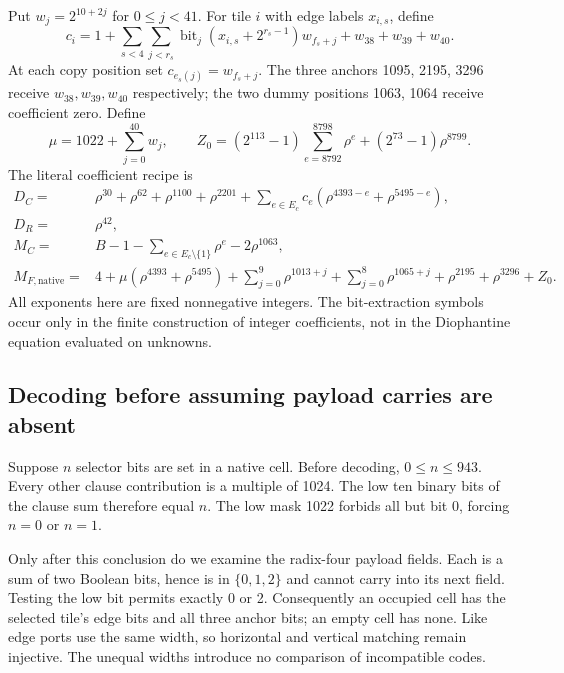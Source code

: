 \documentclass[11pt]{article}
\begin{document}
Put $w_j=2^{10+2j}$ for $0\le j<41$. For tile $i$ with edge labels
$x_{i,s}$, define
\[
 c_i=1+\sum_{s<4}\sum_{j<r_s}
   \operatorname{bit}_j(x_{i,s}+2^{r_s-1})w_{f_s+j}
   +w_{38}+w_{39}+w_{40}.
\]
At each copy position set $c_{e_s(j)}=w_{f_s+j}$. The three anchors
1095, 2195, 3296 receive $w_{38},w_{39},w_{40}$ respectively; the two dummy
positions 1063, 1064 receive coefficient zero. Define
\[
 \mu=1022+\sum_{j=0}^{40}w_j,
 \qquad
 Z_0=(2^{113}-1)\sum_{e=8792}^{8798}\rho^e
                +(2^{73}-1)\rho^{8799}.
\]
The literal coefficient recipe is
\begin{align*}
 D_C={}&\rho^{30}+\rho^{62}+\rho^{1100}+\rho^{2201}
       +\sum_{e\in E_c}c_e(\rho^{4393-e}+\rho^{5495-e}),\\
 D_R={}&\rho^{42},\\
 M_C={}&B-1-\sum_{e\in E_c\setminus\{1\}}\rho^e-2\rho^{1063},\\
 M_{F,\mathrm{native}}={}&4+\mu(\rho^{4393}+\rho^{5495})
       +\sum_{j=0}^{9}\rho^{1013+j}
       +\sum_{j=0}^{8}\rho^{1065+j}
       +\rho^{2195}+\rho^{3296}+Z_0.
\end{align*}
All exponents here are fixed nonnegative integers. The bit-extraction symbols
occur only in the finite construction of integer coefficients, not in the
Diophantine equation evaluated on unknowns.

\subsection{Decoding before assuming payload carries are absent}

Suppose $n$ selector bits are set in a native cell. Before decoding,
$0\le n\le943$. Every other clause contribution is a multiple of 1024.
The low ten binary bits of the clause sum therefore equal $n$. The low
mask 1022 forbids all but bit 0, forcing $n=0$ or $n=1$.

Only after this conclusion do we examine the radix-four payload fields.
Each is a sum of two Boolean bits, hence is in $\{0,1,2\}$ and cannot
carry into its next field. Testing the low bit permits exactly 0 or 2.
Consequently an occupied cell has the selected tile's edge bits and all
three anchor bits; an empty cell has none. Like edge ports use the same
width, so horizontal and vertical matching remain injective. The unequal
widths introduce no comparison of incompatible codes.
\end{document}
